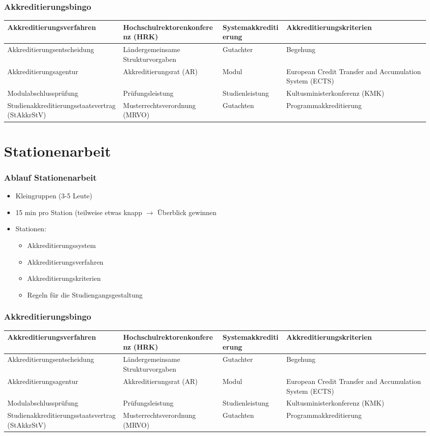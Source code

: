 \documentclass{beamer}
\def\bingo{
\footnotesize
  \begin{tabular}{|m{.2\textwidth}|m{.2\textwidth}|m{.2\textwidth}|m{.2\textwidth}|}
  \hline
  Akkreditierungs\-verfahren & Hochschul\-rektorenkonferenz (HRK) & System\-akkreditierung & Akkreditierungs\-kriterien \\\hline
  Akkreditierungs\-entscheidung & L\"andergemein\-same Struktur\-vorgaben & Gutachter & Begehung \\\hline
  Akkreditierungs\-agentur & Akkreditierungs\-rat (AR) & Modul & European Credit Transfer and Accumulation System (ECTS) \\\hline
  Modulabschluss\-pr\"ufung & Pr\"ufungs\-leistung & Studien\-leistung & Kultusminister\-konferenz (KMK) \\\hline
  Studienakkredi\-tierungsstaats\-vertrag\newline (StAkkrStV) & Musterrechts\-verordnung (MRVO) &  Gutachten & Programm\-akkreditierung \\\hline
  \end{tabular}
}
\begin{document}
\begin{frame} 
  \frametitle{Akkreditierungsbingo} 
  \bingo
\end{frame}
\section{Stationenarbeit}
\frame{\tableofcontents[currentsection]}
\begin{frame} 
  \frametitle{Ablauf Stationenarbeit} 
  \begin{itemize}
  	\item Kleingruppen (3-5 Leute)
  	\item 15 min pro Station (teilweise etwas knapp $\rightarrow$ Überblick gewinnen
  	\vspace{0.5 cm}
  	\item Stationen:
  	\begin{itemize}
  		\item Akkreditierungssystem
  		\item Akkreditierungsverfahren
  		\item Akkreditierungskriterien
  		\item Regeln für die Studiengangsgestaltung
  	\end{itemize}
  \end{itemize}   
\end{frame}
\begin{frame} 
  \frametitle{Akkreditierungsbingo} 
  \bingo
\end{frame}
\end{document}
